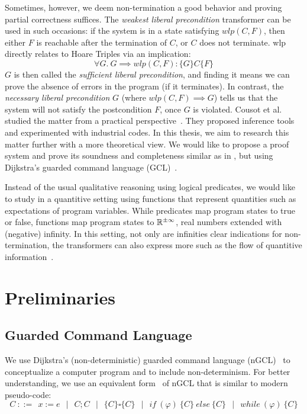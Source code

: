 \documentclass[adraft,hidelinks]{eptcs}
\begin{document}
Sometimes, however, we deem non-termination a good behavior and proving partial correctness suffices. 
The \textit{weakest liberal precondition} transformer \cite{Dijkstra1990} can be used in such occasions: 
if the system is in a state satisfying $wlp(C,F)$, then either $F$ is reachable after the termination of $C$, or $C$ does not terminate.
wlp directly relates to Hoare Triples via an implication: 
\[\forall G.\ G\implies wlp(C,F): \{G\} C \{F\}\]
$G$ is then called the \textit{sufficient liberal precondition}, and finding it means we can prove the absence of errors in the program (if it terminates). 
In contrast, the \textit{necessary liberal precondition} $G$ (where $ wlp(C,F)\implies G$) tells us that the system will not satisfy the postcondition $F$, once $G$ is violated. 
Cousot et al. studied the matter from a practical perspective~\cite{Cousot2013}. 
They proposed inference tools and experimented with industrial codes.
In this thesis, we aim to research this matter further with a more theoretical view. 
We would like to propose a proof system and prove its soundness and completeness similar as in \cite{Vries2011}, but using Dijkstra's guarded command language (GCL)~\cite{Dijkstra1975}. 

Instead of the usual qualitative reasoning using logical predicates, we would like to study in a quantitive setting using functions that represent quantities such as expectations of program variables. 
While predicates map program states to true or false, functions map program states to $\mathbb{R}^{\pm\infty}$, real numbers extended with (negative) infinity. 
In this setting, not only are infinities clear indications for non-termination, the transformers can also express more such as the flow of quantitive information~\cite{Zhang2022}.


\section{Preliminaries}
\subsection{Guarded Command Language}
We use Dijkstra's (non-deterministic) guarded command language (nGCL)~\cite{Dijkstra1975} to conceptualize a computer program and to include non-determinism. 
For better understanding, we use an equivalent form~\cite{Zhang2022} of nGCL that is similar to modern pseudo-code: 
$$C\ ::=\ \  x:= e \ \ \mid\ \  C;C \ \ \mid\ \  \{C\} \square \{C\} \ \ \mid\ \  
if\ (\varphi)\ \{C\}\ else\ \{C\} \ \ \mid\ \  while\ (\varphi)\ \{C\}$$
\end{document}
